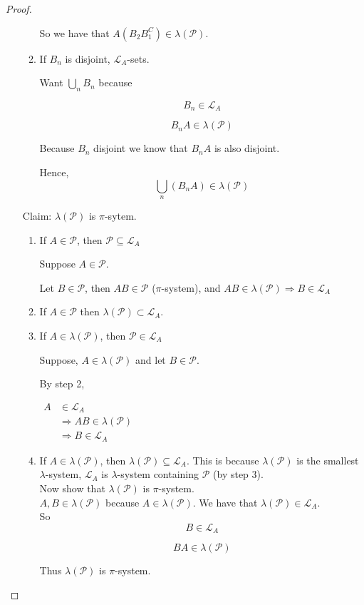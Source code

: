 \documentclass[11pt,fleqn]{book} %
\begin{document}
\begin{proof}
\begin{enumerate}
\begin{enumerate}
			So we have that $A(B_2 B_1^C) \in \lambda(\mathcal{P})$.

			\item If $B_n$ is disjoint, $\mathcal{L}_A$-sets. 

			Want $\bigcup_n B_n$ because 

			$$B_n \in \mathcal{L}_A $$

			$$B_n A \in \lambda(\mathcal{P}) $$

			Because $B_n$ disjoint we know that $B_n A$ is also disjoint.

			Hence, 
			$$\bigcup_n(B_n A) \in \lambda(\mathcal{P})$$


		\end{enumerate}

	Claim: $\lambda(\mathcal{P})$ is $\pi$-sytem.

	\begin{enumerate}
		\item If $A \in \mathcal{P}$, then $\mathcal{P} \subseteq \mathcal{L}_A$

	Suppose $A \in \mathcal{P}$.

	Let $B \in \mathcal{P}$, then $AB \in \mathcal{P}$ ($\pi$-system), and $AB \in \lambda(\mathcal{P}) \Rightarrow B \in \mathcal{L}_A$

		\item If $A \in \mathcal{P}$ then $\lambda(\mathcal{P}) \subset \mathcal{L}_A$.

		\item If $A \in \lambda(\mathcal{P})$, then $\mathcal{P} \in \mathcal{L}_A$

		Suppose, $A \in \lambda(\mathcal{P})$ and let $B \in \mathcal{P}$. 

		By step 2,


			$\begin{aligned}
				A &\in \mathcal{L}_A\\
					&\Rightarrow AB \in \lambda(\mathcal{P})\\
					&\Rightarrow B \in \mathcal{L}_A	
			\end{aligned}$

		\item If $A \in \lambda(\mathcal{P})$, then $\lambda(\mathcal{P}) \subseteq \mathcal{L}_A$. This is because $\lambda(\mathcal{P})$ is the smallest $\lambda$-system, $\mathcal{L}_A$ is $\lambda$-system containing $\mathcal{P}$ (by step 3).\\

		Now show that $\lambda(\mathcal{P})$ is $\pi$-system.\\

		$A, B \in \lambda(\mathcal{P})$ because $A \in \lambda(\mathcal{P})$. We have that $\lambda(\mathcal{P}) \in \mathcal{L}_A$.\\

		So 
		$$B \in \mathcal{L}_A $$ 

		$$BA \in \lambda(\mathcal{P})$$

		Thus $\lambda(\mathcal{P})$ is $\pi$-system.
	\end{enumerate}
	\end{enumerate}
\end{proof}
\end{document}
